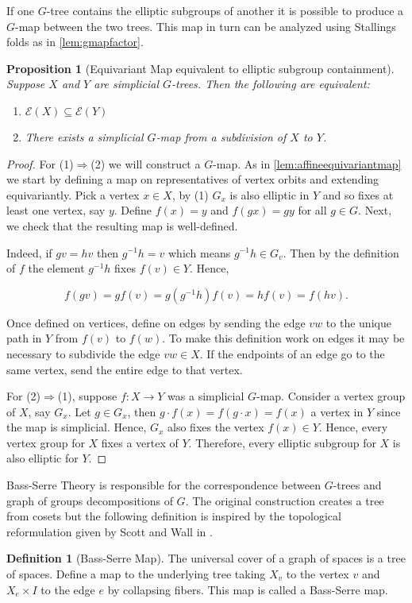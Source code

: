 \documentclass[12pt,parskip=full]{report}
\theoremstyle{plain}
\newtheorem{prop}[thm]{Proposition}
\theoremstyle{definition}
\newtheorem{dfn}[thm]{Definition}
\begin{document}
If one \(G\)-tree contains the elliptic subgroups of another it is possible to produce a \(G\)-map between the two trees. This map in turn can be analyzed using Stallings folds as in \ref{lem:gmapfactor}.
\begin{prop}
[Equivariant Map equivalent to elliptic subgroup containment]
\label{pro:gmapfromsubset}
Suppose $X$ and $Y$ are simplicial \(G\)-trees. Then the following are equivalent:
\begin{enumerate}
    \item \(\mathcal{E}(X) \subseteq \mathcal{E}(Y)\)
    \item There exists a simplicial $G$-map from a subdivision of $X$ to $Y$.
\end{enumerate}
\end{prop}
\begin{proof}
    For (1)$\Rightarrow$(2) we will construct a $G$-map. As in \ref{lem:affineequivariantmap} we start by defining a map on representatives of vertex orbits and extending equivariantly. Pick a vertex \(x\in X\), by (1) \(G_x\) is also elliptic in \(Y\) and so fixes at least one vertex, say \(y\). Define \(f(x)=y\) and \(f(gx) = gy\) for all \(g\in G\). Next, we check that the resulting map is well-defined.
    
    Indeed, if \(gv = hv\) then \(g^{-1}h = v\) which means \(g^{-1}h \in G_v\). Then by the definition of \(f\) the element \(g^{-1}h\) fixes \(f(v)\in Y\). Hence,
    
    \[f(gv) = gf(v) = g(g^{-1}h)f(v) = hf(v) = f(hv).\]
    
    Once defined on vertices, define on edges by sending the edge \(vw\) to the unique path in \(Y\) from \(f(v)\) to \(f(w)\). To make this definition work on edges it may be necessary to subdivide the edge \(vw \in X\). If the endpoints of an edge go to the same vertex, send the entire edge to that vertex. 
    
    For (2)$\Rightarrow$(1), suppose $f:X\to Y$ was a simplicial $G$-map. Consider a vertex group of $X$, say $G_x$. Let $g\in G_x$, then $g\cdot f(x)=f(g\cdot x)=f(x)$ a vertex in $Y$ since the map is simplicial. Hence, $G_x$ also fixes the vertex $f(x)\in Y$. Hence, every vertex group for $X$ fixes a vertex of $Y$. Therefore, every elliptic subgroup for $X$ is also elliptic for $Y$.
\end{proof}

Bass-Serre Theory is responsible for the correspondence between \(G\)-trees and graph of groups decompositions of \(G\). The original construction creates a tree from cosets but the following definition is inspired by the topological reformulation given by Scott and Wall in \cite{scottwall}.
\begin{dfn}
    [Bass-Serre Map]
    \label{defn:bsmap}
    The universal cover of a graph of spaces is a tree of spaces. Define a map to the underlying tree taking $X_v$ to the vertex \(v\) and $X_e \times I$ to the edge \(e\) by collapsing fibers. This map is called a Bass-Serre map.
\end{dfn}
\end{document}
